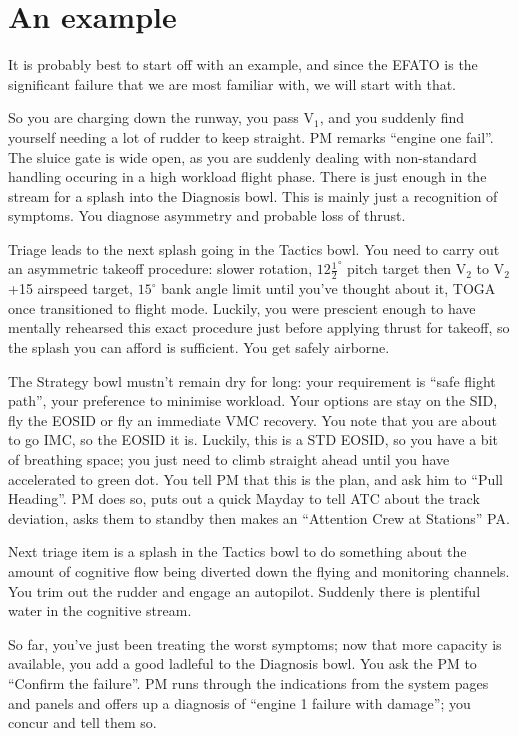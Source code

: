\documentclass[a5paper,11pt,titlepage]{article}
\begin{document}
\section{An example}

It is probably best to start off with an example, and since the EFATO is
the significant failure that we are most familiar with, we will start
with that.

So you are charging down the runway, you pass V$_1$, and you suddenly
find yourself needing a lot of rudder to keep straight. PM remarks
``engine one fail''. The sluice gate is wide open, as you are suddenly
dealing with non-standard handling occuring in a high workload flight
phase. There is just enough in the stream for a splash into the
Diagnosis bowl. This is mainly just a recognition of symptoms. You
diagnose asymmetry and probable loss of thrust.

Triage leads to the next splash going in the Tactics bowl. You need to
carry out an asymmetric takeoff procedure: slower rotation,
$12\frac{1}{2}^{\circ}$ pitch target then V$_2$ to V$_2$+15 airspeed
target, $15^{\circ}$ bank angle limit until you've thought about it,
TOGA once transitioned to flight mode. Luckily, you were prescient
enough to have mentally rehearsed this exact procedure just before
applying thrust for takeoff, so the splash you can afford is
sufficient. You get safely airborne.

The Strategy bowl mustn't remain dry for long: your requirement is
``safe flight path'', your preference to minimise workload. Your options
are stay on the SID, fly the EOSID or fly an immediate VMC recovery. You
note that you are about to go IMC, so the EOSID it is. Luckily, this is
a STD EOSID, so you have a bit of breathing space; you just need to
climb straight ahead until you have accelerated to green dot. You tell
PM that this is the plan, and ask him to ``Pull Heading''. PM does so,
puts out a quick Mayday to tell ATC about the track deviation, asks them
to standby then makes an ``Attention Crew at Stations'' PA.

Next triage item is a splash in the Tactics bowl to do something about
the amount of cognitive flow being diverted down the flying and
monitoring channels. You trim out the rudder and engage an
autopilot. Suddenly there is plentiful water in the cognitive stream.

So far, you've just been treating the worst symptoms; now that more
capacity is available, you add a good ladleful to the Diagnosis bowl.
You ask the PM to ``Confirm the failure''. PM runs through the
indications from the system pages and panels and offers up a diagnosis of
``engine 1 failure with damage''; you concur and tell them so.
\end{document}
